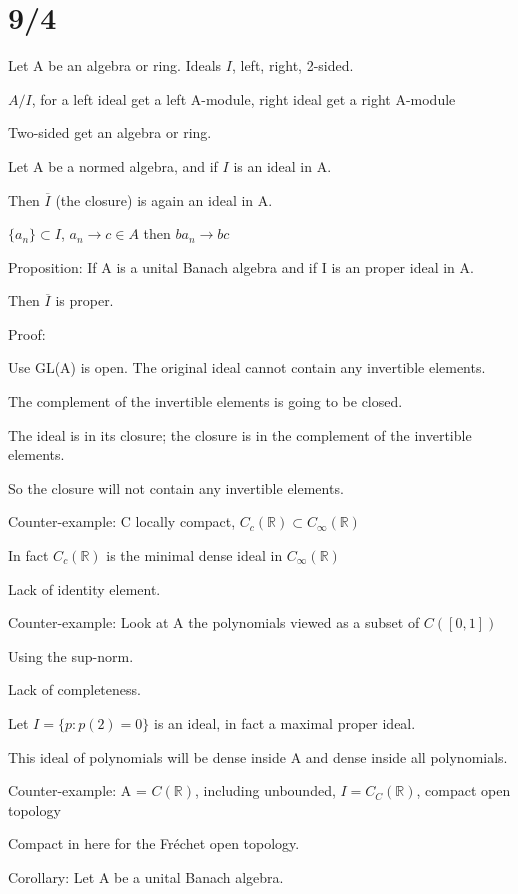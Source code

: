 \documentclass[12pt]{article}
\begin{document}
\section{9/4}

Let A be an algebra or ring.  Ideals $I$, left, right, 2-sided.

$A\slash I$, for a left ideal get a left A-module, right ideal get a right A-module

Two-sided get an algebra or ring.

\noindent
Let A be a normed algebra, and if $I$ is an ideal in A.

Then $\overline{I}$ (the closure) is again an ideal in A.

$\{a_n\} \subset I$, $a_n \to c \in A$ then $ba_n \to bc$

\noindent
Proposition: If A is a unital Banach algebra and if I is an proper ideal in A.

Then $\overline{I}$ is proper.

\noindent
Proof:

Use GL(A) is open.  The original ideal cannot contain any invertible elements.

The complement of the invertible elements is going to be closed.

The ideal is in its closure; the closure is in the complement of the invertible elements.

So the closure will not contain any invertible elements.

\noindent
Counter-example: C locally compact, $C_c(\mathds{R}) \subset C_\infty(\mathds{R})$

In fact $C_c(\mathds{R})$ is the minimal dense ideal in $C_\infty(\mathds{R})$

Lack of identity element.

\noindent
Counter-example: Look at A the polynomials viewed as a subset of $C([0, 1])$

Using the sup-norm.

Lack of completeness.

Let $I = \{p: p(2) = 0\}$ is an ideal, in fact a maximal proper ideal.

This ideal of polynomials will be dense inside A and dense inside all polynomials.

\noindent
Counter-example: A = $C(\mathds{R})$, including unbounded, $I = C_C(\mathds{R})$, compact open topology

Compact in here for the Fr\'{e}chet open topology.

\noindent
Corollary: Let A be a unital Banach algebra.
\end{document}
